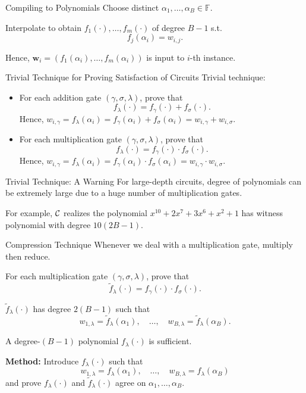 
\begin{frame}{Compiling to Polynomials}
	Choose distinct $\alpha_1, \dots, \alpha_B \in \mathbb{F}$.
	
	Interpolate to obtain $f_1(\cdot), \dots, f_m(\cdot)$ of degree $B - 1$ s.t.
	\begin{equation*}
		f_j(\alpha_i) = w_{i,j}.
	\end{equation*}

	Hence, $\mathbf{w}_i = (f_1(\alpha_i), \dots, f_m(\alpha_i))$ is input to $i$-th instance. 
\end{frame}

\begin{frame}{Trivial Technique for Proving Satisfaction of Circuits}
	Trivial technique:
	\begin{itemize}
		\item For each addition gate $(\gamma, \sigma, \lambda)$, prove that $$f_\lambda(\cdot) = f_\gamma(\cdot) + f_\sigma(\cdot).$$
		Hence, $w_{i,\gamma} = f_\lambda(\alpha_i) = f_\gamma(\alpha_i) + f_\sigma(\alpha_i) = w_{i, \gamma} + w_{i, \sigma}$.
		\item For each multiplication gate $(\gamma, \sigma, \lambda)$, prove that $$f_\lambda(\cdot) = f_\gamma(\cdot) \cdot f_\sigma(\cdot).$$
		Hence, $w_{i,\gamma} = f_\lambda(\alpha_i) = f_\gamma(\alpha_i) \cdot f_\sigma(\alpha_i) = w_{i, \gamma} \cdot w_{i, \sigma}$.
	\end{itemize} 
\end{frame} 
\begin{frame}{Trivial Technique: A Warning}
	For large-depth circuits, degree of polynomials can be extremely large due to a huge number of multiplication gates.
	
	For example, $\mathcal{C}$ realizes the polynomial $x^{10} + 2x^7 + 3x^6 + x^2 + 1$ has witness polynomial with degree $10(2B - 1)$.
\end{frame} 
\begin{frame}{Compression Technique}
	Whenever we deal with a multiplication gate, multiply then reduce.
	
	For each multiplication gate $(\gamma, \sigma, \lambda)$, prove that $$\tilde{f}_\lambda(\cdot) = f_\gamma(\cdot) \cdot f_\sigma(\cdot).$$
	
	$\tilde{f}_\lambda(\cdot)$ has degree $2(B - 1)$ such that 
	\begin{equation*}
	 	w_{1, \lambda} = \tilde{f}_\lambda(\alpha_1), \quad \dots, \quad w_{B, \lambda} = \tilde{f}_\lambda(\alpha_B). 
	\end{equation*}
	
	A degree-$(B - 1)$ polynomial $f_\lambda(\cdot)$ is sufficient.
	
	\textbf{Method:} Introduce $f_\lambda(\cdot)$ such that 
	\begin{equation*}
		w_{1, \lambda} = f_\lambda(\alpha_1), \quad \dots, \quad w_{B, \lambda} = f_\lambda(\alpha_B)
	\end{equation*}
	and prove $f_\lambda(\cdot)$ and $\tilde{f}_\lambda(\cdot)$ agree on $\alpha_1, \dots, \alpha_B$.
\end{frame}
